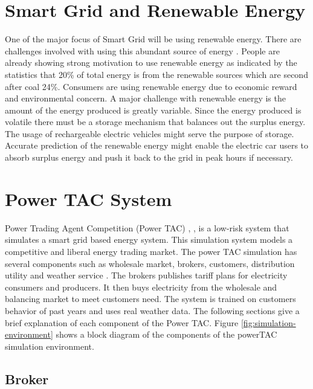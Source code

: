\section{Smart Grid and Renewable Energy}
One of the major focus of Smart Grid will be using renewable energy. There are challenges involved with using this abundant source of energy \cite{richter2012transitioning}. People are already showing strong motivation to use renewable energy as indicated by the statistics that 20\% of total energy is from the renewable sources which are second after coal 24\%. Consumers are using renewable energy due to economic reward and environmental concern. A major challenge with renewable energy is the amount of the energy produced is greatly variable. Since the energy produced is volatile there must be a storage mechanism that balances out the surplus energy. The usage of rechargeable electric vehicles might serve the purpose of storage. Accurate prediction of the renewable energy might enable the electric car users to absorb surplus energy and push it back to the grid in peak hours if necessary. 


\section{Power TAC System}

Power Trading Agent Competition (Power TAC) \cite{ketter2013power}, \cite{ketter20162016}, is a low-risk system that simulates a smart grid based energy system. This simulation system models a competitive and liberal energy trading market. The power TAC simulation has several components such as wholesale market, brokers, customers, distribution utility and weather service \cite{ketter20162016}. The brokers publishes tariff plans for electricity consumers and producers. It then buys electricity from the wholesale and balancing market to meet customers need. The system is trained on customers behavior of past years and uses real weather data. The following sections give a brief explanation of each component of the Power TAC. Figure \ref{fig:simulation-environment}  shows a block diagram of the components of the powerTAC simulation environment.

\subsection{Broker}

